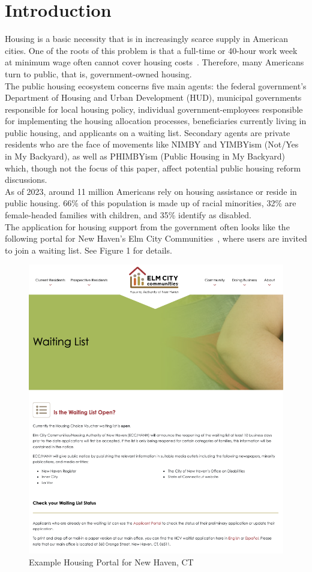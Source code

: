 \documentclass[11pt]{article}
\begin{document}
\section{Introduction}
Housing is a basic necessity that is in increasingly scarce supply in American cities. One of the roots of this problem is that a full-time or 40-hour work week at minimum wage often cannot cover housing costs~\cite{nlihc_out_2019}. Therefore, many Americans turn to public, that is, government-owned housing. \\
\newline
The public housing ecosystem concerns five main agents: the federal government’s Department of Housing and Urban Development (HUD), municipal governments responsible for local housing policy, individual government-employees  responsible for implementing the housing allocation processes, beneficiaries currently living in public housing, and applicants on a waiting list. Secondary agents are private residents who are the face of movements like NIMBY and YIMBYism (Not/Yes in My Backyard), as well as PHIMBYism (Public Housing in My Backyard) which, though not the focus of this paper, affect potential public housing reform discussions. \\
\newline
As of 2023, around 11 million Americans rely on housing assistance or reside in public housing. 66\% of this population is made up of racial minorities, 32\% are female-headed families with children, and 35\% identify as disabled. \\
\newline
The application for housing support from the government often looks like the following portal for New Haven’s Elm City Communities~\cite{elm_city_communities_public_nodate}, where users are invited to join a waiting list. See Figure 1 for details.
\newline
\begin{figure}
    \centering
    \includegraphics[width=0.75\linewidth]{elm.png}
    \caption{Example Housing Portal for New Haven, CT}
\end{figure}
\end{document}
